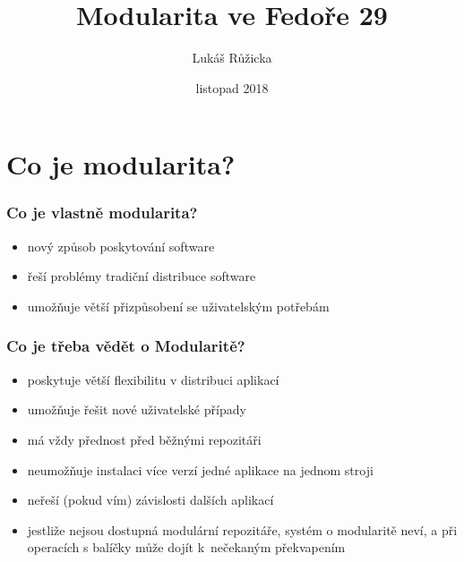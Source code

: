 \documentclass[12pt]{beamer}
\begin{document}
	\author{Lukáš Růžicka}
	\title{Modularita ve Fedoře 29}
	\subtitle{}
	\date{listopad 2018}
	\subject{Fedora 29}
	\begin{frame}[plain]
	\maketitle
\end{frame}

\section{Co je modularita?}

\begin{frame}
\frametitle{Co je vlastně modularita?}

\begin{itemize}
	\item nový způsob poskytování software
	\item řeší problémy tradiční distribuce software
	\item umožňuje větší přizpůsobení se uživatelským potřebám
\end{itemize}
\end{frame}

\begin{frame}
\frametitle{Co je třeba vědět o Modularitě?}

\begin{itemize}
	\item poskytuje větší flexibilitu v distribuci aplikací
	\item umožňuje řešit nové uživatelské případy
	\item má vždy přednost před běžnými repozitáři
	\item neumožňuje instalaci více verzí jedné aplikace na jednom stroji
	\item neřeší (pokud vím) závislosti dalších aplikací
	\item jestliže nejsou dostupná modulární repozitáře, systém o modularitě neví, a při operacích s balíčky může dojít k~nečekaným překvapením 
\end{itemize}
\end{frame}
\end{document}
